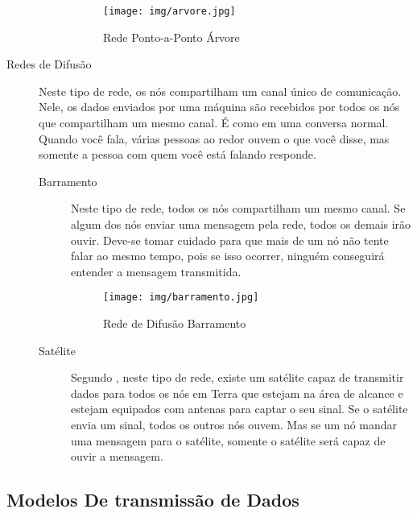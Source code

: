 \begin{description}
\begin{description}
					\begin{figure}[!htb]
						\centering
						\texttt{[image: img/arvore.jpg]}
						\caption{Rede Ponto-a-Ponto Árvore}
						\label{Rede Árvore}
					\end{figure}
			\end{description}
		\item[Redes de Difusão] Neste tipo de rede, os nós compartilham um canal único de comunicação. Nele, os dados enviados por uma máquina são recebidos por todos os nós que compartilham um mesmo canal. É como em uma conversa normal. Quando você fala, várias pessoas ao redor ouvem o que você disse, mas somente a pessoa com quem você está falando responde.
			\begin{description}
				\item[Barramento] Neste tipo de rede, todos os nós compartilham um mesmo canal. Se algum dos nós enviar uma mensagem pela rede, todos os demais irão ouvir. Deve-se tomar cuidado para que mais de um nó não tente falar ao mesmo tempo, pois se isso ocorrer, ninguém conseguirá entender a mensagem transmitida.
				\begin{figure}[!htb]
					\centering
					\texttt{[image: img/barramento.jpg]}
					\caption{Rede de Difusão Barramento}
					\label{Rede Barramento}
				\end{figure}
				\item[Satélite] Segundo \cite{torres2015redes}, neste tipo de rede, existe um satélite capaz de transmitir dados para todos os nós em Terra que estejam na área de alcance e estejam equipados com antenas para captar o seu sinal. Se o satélite envia um sinal, todos os outros nós ouvem. Mas se um nó mandar uma mensagem para o satélite, somente o satélite será capaz de ouvir a mensagem.
			\end{description}
	\end{description}

	\subsection{Modelos De transmissão de Dados}
	














